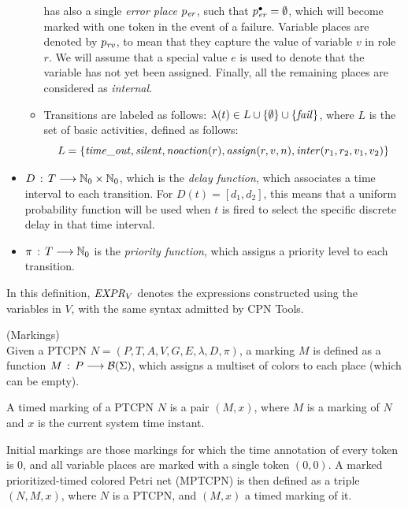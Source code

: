 \begin{definition}
\begin{itemize}
\begin{itemize}
has also a single {\em error place} $p_{\it er}$,
such that $p^{\bullet}_{\it er}=\emptyset$, which will become marked
with one token in the event of a failure. Variable places
are denoted by $p_{\it rv}$, to mean that they capture the value
of variable $v$ in role $r$. We will assume that a special value $e$
is used to denote that the variable has not yet been 
assigned. Finally, all the remaining places are
considered as {\em internal}.
%
\item Transitions are labeled as follows: $\lambda(t)\in L
\cup \{ \emptyset \} \cup \{ {\it fail} \}$, where
$L$ is the set of basic activities, defined as follows:
%
\[
    L = \{ {\it time\_out}, 
           {\it silent}, {\it noaction}(r), {\it assign}(r,v,n),
           {\it inter}(r_1,r_2,v_1,v_2) \} 
\]
%
\end{itemize}
%
\item $D\,:\,T \longrightarrow \mathbb{N}_{0} \times \mathbb{N}_{0}$, which
is the {\em delay function}, which associates a time
interval to each transition. For $D(t)=[d_1,d_2]$,
this means that a uniform probability function will
be used when $t$ is fired to select the specific discrete
delay in that time interval.
%
\item $\pi\,:\,T \longrightarrow \mathbb{N}_{0}$ is the
{\em priority function}, which assigns a priority level
to each transition. 
\end{itemize}

In this definition, ${\it EXPR}_V$ denotes the
expressions constructed using the variables in $V$,
with the same syntax admitted by CPN Tools.
\end{definition}

\begin{definition} (Markings)\\
Given a PTCPN $N=(P,T,A,V,G,E,\lambda,D,\pi)$,
a marking $M$ is defined as a function
$M\,:\,P \longrightarrow {\cal B}(\Sigma)$,
which assigns a multiset of colors to each place
(which can be empty). 

A timed marking of a PTCPN $N$ is a pair $(M,x)$, where
$M$ is a marking of $N$ and $x$ is the current system time instant.
%
%

Initial markings are those markings for which
the time annotation of every token is $0$,
and all variable places are marked with a single
token $(0,0)$.
A marked prioritized-timed colored Petri net (MPTCPN)
is then defined as a triple $(N,M,x)$, where
$N$ is a PTCPN, and $(M,x)$ a timed marking of it.
%
\end{definition}

